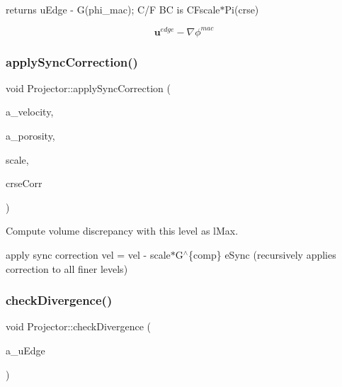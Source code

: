returns u\+Edge -\/ G(phi\+\_\+mac); C/F BC is C\+Fscale$\ast$\+Pi(crse) 

\[ \mathbf{u}^{edge} - \nabla \phi^{mac} \] \mbox{\label{class_projector_ae631800ea52b4cd4b446ef86a697fb3f}} 
\subsubsection{\texorpdfstring{apply\+Sync\+Correction()}{applySyncCorrection()}}
{\footnotesize\ttfamily void Projector\+::apply\+Sync\+Correction (\begin{DoxyParamCaption}\item[{\textbf{ Vector}$<$ \textbf{ Level\+Data}$<$ \textbf{ F\+Array\+Box} $>$ $\ast$ $>$ \&}]{a\+\_\+velocity,  }\item[{\textbf{ Vector}$<$ \textbf{ Ref\+Counted\+Ptr}$<$ \textbf{ Level\+Data}$<$ \textbf{ F\+Array\+Box} $>$ $>$ $>$ \&}]{a\+\_\+porosity,  }\item[{const \textbf{ Real}}]{scale,  }\item[{\textbf{ Level\+Data}$<$ \textbf{ F\+Array\+Box} $>$ $\ast$}]{crse\+Corr }\end{DoxyParamCaption})\hspace{0.3cm}{\ttfamily [protected]}}



Compute volume discrepancy with this level as l\+Max. 

apply sync correction vel = vel -\/ scale$\ast$\+G$^\wedge$\{comp\} e\+Sync (recursively applies correction to all finer levels) \mbox{\label{class_projector_ad063e890cdab51aa662c02fc8137cc49}} 
\subsubsection{\texorpdfstring{check\+Divergence()}{checkDivergence()}}
{\footnotesize\ttfamily void Projector\+::check\+Divergence (\begin{DoxyParamCaption}\item[{\textbf{ Level\+Data}$<$ \textbf{ Flux\+Box} $>$ \&}]{a\+\_\+u\+Edge }\end{DoxyParamCaption})}



